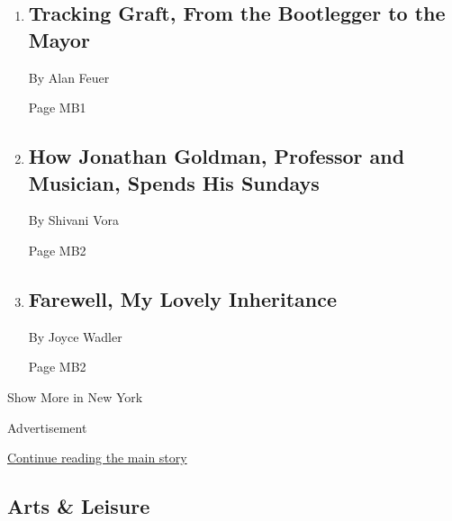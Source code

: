 \begin{enumerate}
\def\labelenumi{\arabic{enumi}.}
\item
  \href{/2018/04/27/nyregion/tracking-graft-from-the-bootlegger-to-the-mayor.html}{}

  \hypertarget{tracking-graft-from-the-bootlegger-to-the-mayor}{%
  \subsection{Tracking Graft, From the Bootlegger to the
  Mayor}\label{tracking-graft-from-the-bootlegger-to-the-mayor}}

  By Alan Feuer

  Page MB1
\item
  \href{/2018/04/27/nyregion/jonathan-goldman-professor-musician-sunday-routine.html}{}

  \hypertarget{how-jonathan-goldman-professor-and-musician-spends-his-sundays}{%
  \subsection{How Jonathan Goldman, Professor and Musician, Spends His
  Sundays}\label{how-jonathan-goldman-professor-and-musician-spends-his-sundays}}

  By Shivani Vora

  Page MB2
\item
  \href{/2018/04/25/nyregion/farewell-my-lovely-inheritance.html}{}

  \hypertarget{farewell-my-lovely-inheritance}{%
  \subsection{Farewell, My Lovely
  Inheritance}\label{farewell-my-lovely-inheritance}}

  By Joyce Wadler

  Page MB2
\end{enumerate}

Show More in New York

Advertisement

\protect\hyperlink{after-mid3}{Continue reading the main story}

\hypertarget{arts--leisure}{%
\subsection{Arts \& Leisure}\label{arts--leisure}}

